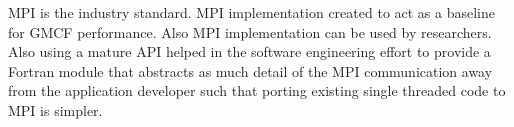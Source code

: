 MPI is the industry standard. MPI implementation created to act as a baseline
for GMCF performance. Also MPI implementation can be used by researchers. Also
using a mature API helped in the software engineering effort to provide a
Fortran module that abstracts as much detail of the MPI communication away from
the application developer such that porting existing single threaded code to MPI
is simpler.
